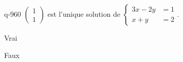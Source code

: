 \begin{truefalse}{q-960}
$\begin{pmatrix}1\\1\end{pmatrix}$ est l'unique solution de $\begin{cases}3x-2y &= 1 \\ x+y &= 2\end{cases}$.
\item* Vrai
\item Faux
\end{truefalse}


